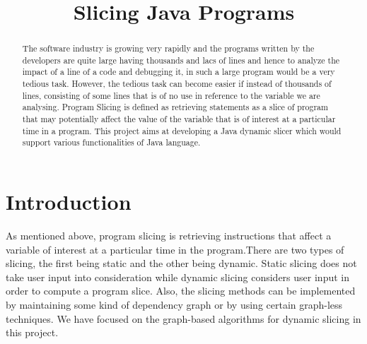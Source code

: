 \documentclass[conference]{IEEEtran}
\begin{document}
\title{Slicing Java Programs\\
}

\author{
\and
{}
}

\maketitle

\begin{abstract}
The software  industry is growing very rapidly and the programs written by the developers are quite large having thousands and lacs of lines and hence to analyze the impact of a line of a code and debugging it, in such a large program would be a very tedious task. However, the tedious task can become easier if instead of thousands of lines, consisting of some lines that is of no use in reference to the variable we are analysing. Program Slicing is defined as retrieving statements as a slice of program that may potentially affect the value of the variable that is of interest at a particular time in a program. This project aims at developing a Java dynamic slicer which would support various functionalities of Java language.
\end{abstract}

\section{Introduction}
As mentioned above, program slicing is retrieving instructions that affect a variable of interest at a particular time in the program.There are two types of slicing, the first being static and the other being dynamic. Static slicing does not take user input into consideration while dynamic slicing considers user input in order to compute a program slice. Also, the slicing methods can be implemented by maintaining some kind of dependency graph or by using certain graph-less techniques. We have focused on the graph-based algorithms for dynamic slicing in this project.
\end{document}
